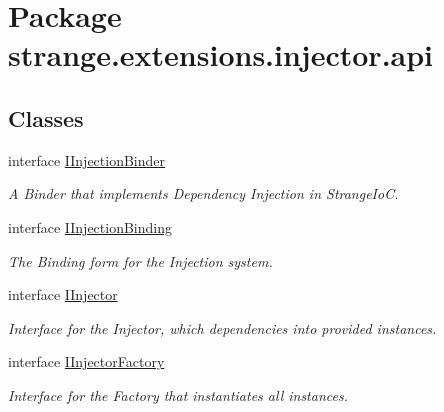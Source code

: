 \hypertarget{namespacestrange_1_1extensions_1_1injector_1_1api}{\section{Package strange.\-extensions.\-injector.\-api}
\label{namespacestrange_1_1extensions_1_1injector_1_1api}
}
\subsection*{Classes}
\begin{DoxyCompactItemize}
\item 
interface \hyperlink{interfacestrange_1_1extensions_1_1injector_1_1api_1_1_i_injection_binder}{I\-Injection\-Binder}
\begin{DoxyCompactList}\small\item\em A Binder that implements Dependency Injection in Strange\-Io\-C. \end{DoxyCompactList}\item 
interface \hyperlink{interfacestrange_1_1extensions_1_1injector_1_1api_1_1_i_injection_binding}{I\-Injection\-Binding}
\begin{DoxyCompactList}\small\item\em The Binding form for the Injection system. \end{DoxyCompactList}\item 
interface \hyperlink{interfacestrange_1_1extensions_1_1injector_1_1api_1_1_i_injector}{I\-Injector}
\begin{DoxyCompactList}\small\item\em Interface for the Injector, which dependencies into provided instances. \end{DoxyCompactList}\item 
interface \hyperlink{interfacestrange_1_1extensions_1_1injector_1_1api_1_1_i_injector_factory}{I\-Injector\-Factory}
\begin{DoxyCompactList}\small\item\em Interface for the Factory that instantiates all instances. \end{DoxyCompactList}\end{DoxyCompactItemize}
